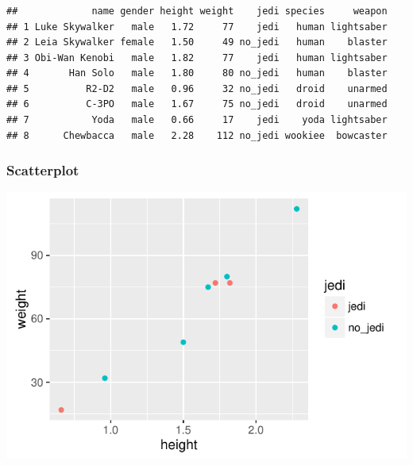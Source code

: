 \documentclass[12pt]{beamer}\usepackage[]{graphicx}\usepackage[]{color}
\makeatletter
\newenvironment{kframe}{%
 \def\at@end@of@kframe{}%
 \ifinner\ifhmode%
  \def\at@end@of@kframe{\end{minipage}}%
  \begin{minipage}{\columnwidth}%
 \fi\fi%
 \def\FrameCommand##1{\hskip\@totalleftmargin \hskip-\fboxsep
 \colorbox{shadecolor}{##1}\hskip-\fboxsep
     \hskip-\linewidth \hskip-\@totalleftmargin \hskip\columnwidth}%
 \MakeFramed {\advance\hsize-\width
   \@totalleftmargin\z@ \linewidth\hsize
   \@setminipage}}%
 {\par\unskip\endMakeFramed%
 \at@end@of@kframe}
\newenvironment{knitrout}{}{} %
\makeatother
\begin{document}
\begin{frame}[fragile]
\frametitle{}
\begin{knitrout}\scriptsize
{}\color{fgcolor}\begin{kframe}
\begin{verbatim}
##             name gender height weight    jedi species     weapon
## 1 Luke Skywalker   male   1.72     77    jedi   human lightsaber
## 2 Leia Skywalker female   1.50     49 no_jedi   human    blaster
## 3 Obi-Wan Kenobi   male   1.82     77    jedi   human lightsaber
## 4       Han Solo   male   1.80     80 no_jedi   human    blaster
## 5          R2-D2   male   0.96     32 no_jedi   droid    unarmed
## 6          C-3PO   male   1.67     75 no_jedi   droid    unarmed
## 7           Yoda   male   0.66     17    jedi    yoda lightsaber
## 8      Chewbacca   male   2.28    112 no_jedi wookiee  bowcaster
\end{verbatim}
\end{kframe}
\end{knitrout}

\end{frame}


\begin{frame}[fragile]
\frametitle{Scatterplot}
\begin{knitrout}\scriptsize
{}\color{fgcolor}

{\centering \includegraphics[width=.85\linewidth,height=.6\linewidth]{figure/sw_scatterplot-1} 

}



\end{knitrout}
\end{frame}
\end{document}
